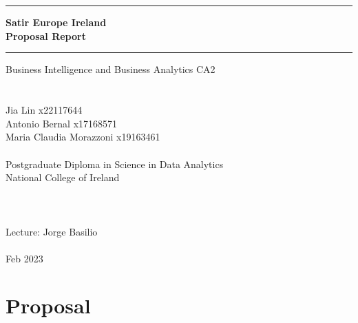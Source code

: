 \documentclass[12pt,a4paper,oneside]{book}
\begin{document}
\pagestyle{plain}
\frontmatter

\begin{titlepage}
\ \\ \ \\
\centering
\rule{\textwidth}{1pt}\par
{\Huge \bfseries Satir Europe Ireland\\}
{\Huge \bfseries Proposal Report\\}
\rule{\textwidth}{1pt}\par

\large Business Intelligence and Business Analytics CA2\\

\ \\ \ \\
\raggedleft
\large Jia Lin x22117644 \\
\large Antonio Bernal x17168571\\
\large Maria Claudia Morazzoni x19163461\\
\ \\
\normalsize Postgraduate Diploma in Science in Data Analytics\\
\normalsize National College of Ireland \ \\ 
\ \\ \ \\ \ \\
\centering
\large Lecture:  Jorge Basilio\\
\ \\
\normalsize Feb 2023
\end{titlepage}




\chapter{Proposal}
\end{document}

